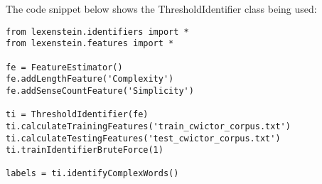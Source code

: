 The code snippet below shows the ThresholdIdentifier class being used:

\begin{lstlisting}
from lexenstein.identifiers import *
from lexenstein.features import *

fe = FeatureEstimator()
fe.addLengthFeature('Complexity')
fe.addSenseCountFeature('Simplicity')

ti = ThresholdIdentifier(fe)
ti.calculateTrainingFeatures('train_cwictor_corpus.txt')
ti.calculateTestingFeatures('test_cwictor_corpus.txt')
ti.trainIdentifierBruteForce(1)

labels = ti.identifyComplexWords()
\end{lstlisting}